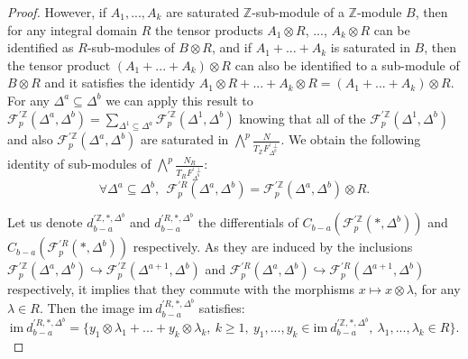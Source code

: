 \documentclass{article}
\begin{document}
\begin{proof}
    However, if $A_1,...,A_k$ are saturated $\mathbb{Z}$-sub-module of a $\mathbb{Z}$-module $B$, then for any integral domain $R$ the tensor products $A_1 \otimes R$, ..., $A_k\otimes R$ can be identified as $R$-sub-modules of $B\otimes R$, and if $A_1+...+A_k$ is saturated in $B$, then the tensor product $(A_1+...+A_k) \otimes R$ can also be identified to a sub-module of $B \otimes R$ and it satisfies the identidy $A_1 \otimes R + ... + A_k \otimes R = (A_1+...+A_k) \otimes R$. For any $\Delta^a\subseteq \Delta^b$ we can apply this result to $\mathcal{F}^{'\mathbb{Z}}_p(\Delta^a,\Delta^b)=\sum_{\Delta^1 \subseteq \Delta^a}\mathcal{F}^{'\mathbb{Z}}_p(\Delta^1,\Delta^b)$ knowing that all of the $\mathcal{F}^{'\mathbb{Z}}_p(\Delta^1,\Delta^b)$ and also $\mathcal{F}^{'\mathbb{Z}}_p(\Delta^a,\Delta^b)$ are saturated in $\bigwedge^p\frac{N}{T_{\mathbb{Z}}F_{\Delta^b}^{'\perp}}$. We obtain the following identity of sub-modules of $\bigwedge^p\frac{N_R}{T_RF_{\Delta^b}^{'\perp}}$:
    \begin{equation}
        \forall \Delta^a\subseteq \Delta^b,~~\mathcal{F}_p^{'R}(\Delta^a,\Delta^b) = \mathcal{F}_p^{'\mathbb{Z}}(\Delta^a,\Delta^b) \otimes R.
        \label{tens}
    \end{equation}
    
    Let us denote $d^{'\mathbb{Z},*,\Delta^b}_{b-a}$ and $d^{'R,*,\Delta^b}_{b-a}$ the differentials of $C_{b-a}(\mathcal{F}^{'\mathbb{Z}}_p(*,\Delta^b))$ and $C_{b-a}(\mathcal{F}^{'R}_p(*,\Delta^b))$ respectively. As they are induced by the inclusions $\mathcal{F}_p^{'\mathbb{Z}}(\Delta^a,\Delta^b)\hookrightarrow \mathcal{F}_p^{'\mathbb{Z}}(\Delta^{a+1},\Delta^b)$ and $\mathcal{F}_p^{'R}(\Delta^a,\Delta^b)\hookrightarrow \mathcal{F}_p^{'R}(\Delta^{a+1},\Delta^b)$ respectively, it implies that they commute with the morphisms $x \mapsto x \otimes \lambda$, for any $\lambda \in R$. Then the image $\mathrm{im}~d^{'R,*,\Delta^b}_{b-a}$ satisfies:
    \begin{equation*}
        \mathrm{im}~d^{'R,*,\Delta^b}_{b-a}=\{y_1\otimes \lambda_1+...+y_k\otimes\lambda_k,~k\geq 1,~y_1,...,y_k\in \mathrm{im}~d^{'\mathbb{Z},*,\Delta^b}_{b-a},~\lambda_1,...,\lambda_k\in R\}.
    \end{equation*}


\end{proof}
\end{document}
